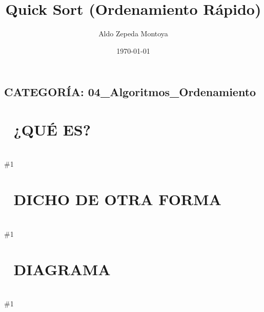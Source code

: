 \documentclass{article}
\newcommand{\quees}[1]{
    \section*{🤔 ¿QUÉ ES?}
    \hrulefill \\
    \#1
}
\newcommand{\dichodeotraforma}[1]{
    \section*{💬 DICHO DE OTRA FORMA}
    \hrulefill \\
    \#1
}
\newcommand{\diagrama}[1]{
    \section*{🎨 DIAGRAMA}
    \hrulefill \\
    \#1
}
\begin{document}
\title{Quick Sort (Ordenamiento Rápido)}
\author{Aldo Zepeda Montoya}
\date{\today}
\maketitle

\subsection*{CATEGORÍA: 04\_Algoritmos\_Ordenamiento}

\quees{
Elegir a un jugador de referencia ⚽ en el equipo (el Pivot). 

Una vez que eliges al Pivot (por ejemplo, el último de la fila), 
separas a todos los demás en dos grupos:
1. Los que son "peores" (número menor) van a la izquierda del Pivot.
2. Los que son "mejores" (número mayor) van a la derecha del Pivot.

Ahora el Pivot quedó en su lugar correcto para siempre. Luego, haces
lo mismo con los dos grupos que quedaron a los lados, hasta que todos
estén ordenados.
}

\dichodeotraforma{
Quick Sort es un algoritmo de ordenamiento por comparación, 
recursivo e In-place. 

Se basa en la operación "Partition": elegir un elemento como Pivot y 
reorganizar el array de modo que los menores queden a la izquierda y 
los mayores a la derecha. 

Aunque su peor caso es O(n^2), en la práctica es mucho más rápido que 
Merge Sort debido a que tiene una excelente "Cache Locality" y no 
requiere memoria extra significativa.
}

\diagrama{\begin{verbatim}
Array: [3, 6, 8, 10, 1, 2, 5]  (Pivot = 5)

Partition:
- Elementos < 5: [3, 1, 2]
- Pivot: 5
- Elementos > 5: [6, 8, 10]

Estado: [3, 1, 2] [5] [6, 8, 10]
(El 5 ya no se mueve más).

Se repite el proceso para [3, 1, 2] y para [6, 8, 10].
\end{verbatim}}
\end{document}
